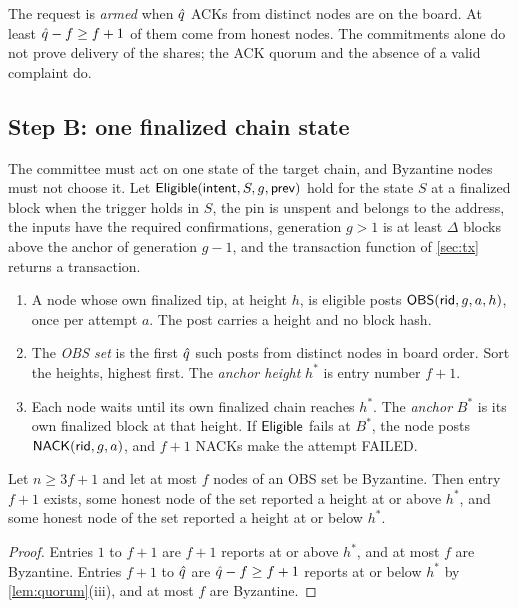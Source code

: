 The request is \emph{armed} when $\hat{q}$ ACKs from distinct nodes are on the board. At least $\hat{q} - f \ge f+1$ of them come from honest nodes. The commitments alone do not prove delivery of the shares; the ACK quorum and the absence of a valid complaint do.

\subsection{Step B: one finalized chain state}\label{sec:anchor}

The committee must act on one state of the target chain, and Byzantine nodes must not choose it. Let $\mathsf{Eligible}(\textsf{intent}, S, g, \textsf{prev})$ hold for the state $S$ at a finalized block when the trigger holds in $S$, the pin is unspent and belongs to the address, the inputs have the required confirmations, generation $g > 1$ is at least $\Delta$ blocks above the anchor of generation $g-1$, and the transaction function of \cref{sec:tx} returns a transaction.

\begin{enumerate}[leftmargin=1.7em,itemsep=1pt]
\item A node whose own finalized tip, at height $h$, is eligible posts $\textsf{OBS}(\mathsf{rid}, g, a, h)$, once per attempt $a$. The post carries a height and no block hash.
\item The \emph{OBS set} is the first $\hat{q}$ such posts from distinct nodes in board order. Sort the heights, highest first. The \emph{anchor height} $h^*$ is entry number $f+1$.
\item Each node waits until its own finalized chain reaches $h^*$. The \emph{anchor} $B^*$ is its own finalized block at that height. If $\mathsf{Eligible}$ fails at $B^*$, the node posts $\textsf{NACK}(\mathsf{rid}, g, a)$, and $f+1$ NACKs make the attempt \textsf{FAILED}.
\end{enumerate}

\begin{lemma}[Anchor]\label{lem:anchor}
Let $n \ge 3f+1$ and let at most $f$ nodes of an OBS set be Byzantine. Then entry $f+1$ exists, some honest node of the set reported a height at or above $h^*$, and some honest node of the set reported a height at or below $h^*$.
\end{lemma}

\begin{proof}
Entries $1$ to $f+1$ are $f+1$ reports at or above $h^*$, and at most $f$ are Byzantine. Entries $f+1$ to $\hat{q}$ are $\hat{q} - f \ge f+1$ reports at or below $h^*$ by \cref{lem:quorum}(iii), and at most $f$ are Byzantine.
\end{proof}

